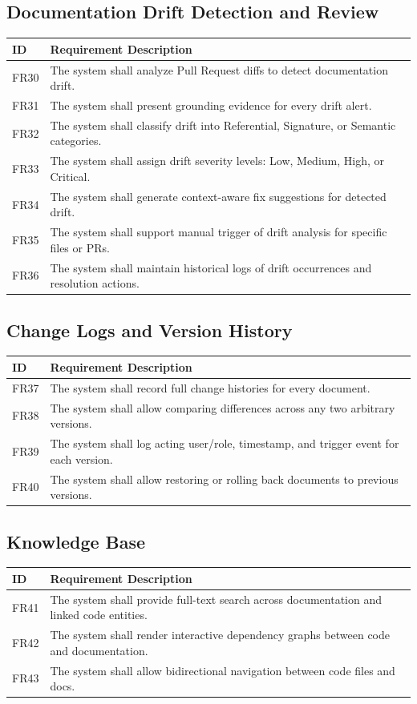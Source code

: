 \subsection{Documentation Drift Detection and Review}
\begin{longtable}{p{2cm} p{11.3cm}}
	\toprule
	\textbf{ID} & \textbf{Requirement Description} \\
	\midrule
	\endhead
	FR30 & The system shall analyze Pull Request diffs to detect documentation drift. \\
	FR31 & The system shall present grounding evidence for every drift alert. \\
	FR32 & The system shall classify drift into Referential, Signature, or Semantic categories. \\
	FR33 & The system shall assign drift severity levels: Low, Medium, High, or Critical. \\
	FR34 & The system shall generate context-aware fix suggestions for detected drift. \\
	FR35 & The system shall support manual trigger of drift analysis for specific files or PRs. \\
	FR36 & The system shall maintain historical logs of drift occurrences and resolution actions. \\
	\bottomrule
\end{longtable}

\subsection{Change Logs and Version History}
\begin{longtable}{p{2cm} p{11.3cm}}
	\toprule
	\textbf{ID} & \textbf{Requirement Description} \\
	\midrule
	\endhead
	FR37 & The system shall record full change histories for every document. \\
	FR38 & The system shall allow comparing differences across any two arbitrary versions. \\
	FR39 & The system shall log acting user/role, timestamp, and trigger event for each version. \\
	FR40 & The system shall allow restoring or rolling back documents to previous versions. \\
	\bottomrule
\end{longtable}

\subsection{Knowledge Base}
\begin{longtable}{p{2cm} p{11.3cm}}
	\toprule
	\textbf{ID} & \textbf{Requirement Description} \\
	\midrule
	\endhead
	FR41 & The system shall provide full-text search across documentation and linked code entities. \\
	FR42 & The system shall render interactive dependency graphs between code and documentation. \\
	FR43 & The system shall allow bidirectional navigation between code files and docs. \\
	\bottomrule
\end{longtable}

